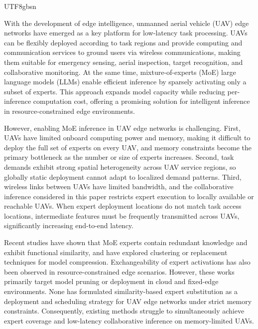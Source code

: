 \documentclass[journal]{IEEEtran}
\begin{document}
\begin{CJK*}{UTF8}{gbsn}

With the development of edge intelligence, unmanned aerial vehicle (UAV) edge networks have emerged as a key platform for low-latency task processing{\color{black}\cite{R1}}. UAVs can be flexibly deployed according to task regions and provide computing and communication services to ground users via wireless communications, making them suitable for emergency sensing, aerial inspection, target recognition, and collaborative monitoring{\color{black}\cite{R3}}. At the same time, mixture-of-experts (MoE) large language models (LLMs) enable efficient inference by sparsely activating only a subset of experts{\color{black}\cite{R4}}. This approach expands model capacity while reducing per-inference computation cost, offering a promising solution for intelligent inference in resource-constrained edge environments{\color{black}\cite{R5}}.

However, enabling MoE inference in UAV edge networks is challenging. First, UAVs have limited onboard computing power and memory, making it difficult to deploy the full set of experts on every UAV, and memory constraints become the primary bottleneck as the number or size of experts increases{\color{black}\cite{R6,R7}}. Second, task demands exhibit strong spatial heterogeneity across UAV service regions, so globally static deployment cannot adapt to localized demand patterns{\color{black}\cite{R8}}. Third, wireless links between UAVs have limited bandwidth, and the collaborative inference considered in this paper restricts expert execution to locally available or reachable UAVs{\color{black}\cite{R9,R10}}. When expert deployment locations do not match task access locations, intermediate features must be frequently transmitted across UAVs, significantly increasing end-to-end latency.

Recent studies have shown that MoE experts contain redundant knowledge and exhibit functional similarity, and have explored clustering or replacement techniques for model compression{\color{black}\cite{R12,R13,R14}}. Exchangeability of expert activations has also been observed in resource-constrained edge scenarios{\color{black}\cite{R15}}. However, these works primarily target model pruning or deployment in cloud and fixed-edge environments. None has formulated similarity-based expert substitution as a deployment and scheduling strategy for UAV edge networks under strict memory constraints. Consequently, existing methods struggle to simultaneously achieve expert coverage and low-latency collaborative inference on memory-limited UAVs.


\end{CJK*}
\end{document}
